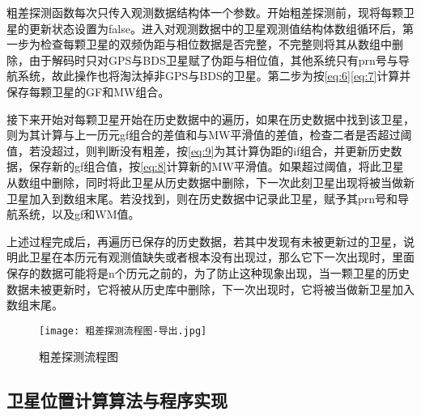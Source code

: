 \documentclass{ctexart}
\begin{document}
粗差探测函数每次只传入观测数据结构体一个参数。开始粗差探测前，现将每颗卫星的更新状态设置为false。进入对观测数据中的卫星观测值结构体数组循环后，第一步为检查每颗卫星的双频伪距与相位数据是否完整，不完整则将其从数组中删除，由于解码时只对GPS与BDS卫星赋了伪距与相位值，其他系统只有prn号与导航系统，故此操作也将淘汰掉非GPS与BDS的卫星。第二步为按\eqref{eq:6}\eqref{eq:7}计算并保存每颗卫星的GF和MW组合。

接下来开始对每颗卫星开始在历史数据中的遍历，如果在历史数据中找到该卫星，则为其计算与上一历元gf组合的差值和与MW平滑值的差值，检查二者是否超过阈值，若没超过，则判断没有粗差，按\eqref{eq:9}为其计算伪距的if组合，并更新历史数据，保存新的gf组合值，按\eqref{eq:8}计算新的MW平滑值。如果超过阈值，将此卫星从数组中删除，同时将此卫星从历史数据中删除，下一次此刻卫星出现将被当做新卫星加入到数组末尾。若没找到，则在历史数据中记录此卫星，赋予其prn号和导航系统，以及gf和WM值。

上述过程完成后，再遍历已保存的历史数据，若其中发现有未被更新过的卫星，说明此卫星在本历元有观测值缺失或者根本没有出现过，那么它下一次出现时，里面保存的数据可能将是n个历元之前的，为了防止这种现象出现，当一颗卫星的历史数据未被更新时，它将被从历史库中删除，下一次出现时，它将被当做新卫星加入数组末尾。

\begin{figure}[H]
\texttt{[image: 粗差探测流程图-导出.jpg]}
\caption{粗差探测流程图}
\end{figure}

\subsection{卫星位置计算算法与程序实现}
\end{document}
